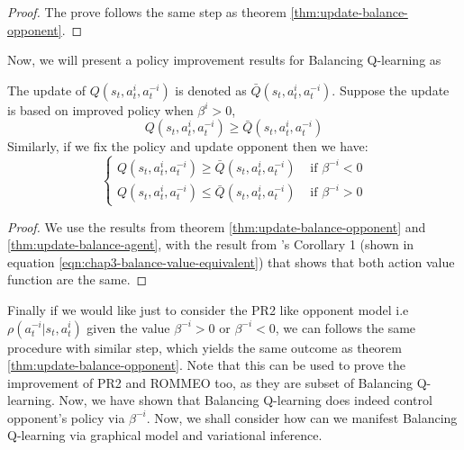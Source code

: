 \begin{proof}
The prove follows the same step as theorem \ref{thm:update-balance-opponent}.
\end{proof}
Now, we will present a policy improvement results for Balancing Q-learning as 
\begin{corollary}
    The update of $Q(s_t, a^i_t, a^{-i}_t)$ is denoted as $\bar{Q}(s_t, a^i_t, a^{-i}_t)$. Suppose the update is based on improved policy when $\beta^i > 0$, 
    \begin{equation}
        Q(s_t, a^i_t, a^{-i}_t) \ge \bar{Q}(s_t, a^i_t, a^{-i}_t)
    \end{equation}
    Similarly, if we fix the policy and update opponent then we have:
    \begin{equation}
    \begin{cases}
        Q(s_t, a^i_t, a^{-i}_t) \ge \bar{Q}(s_t, a^i_t, a^{-i}_t) &\text{ if } \beta^{-i} < 0 \\
        Q(s_t, a^i_t, a^{-i}_t) \le \bar{Q}(s_t, a^i_t, a^{-i}_t)&\text{ if } \beta^{-i} > 0
    \end{cases}
    \end{equation}
\end{corollary}
\begin{proof}
We use the results from theorem \ref{thm:update-balance-opponent} and \ref{thm:update-balance-agent}, with the result from \cite{grau2018balancing}'s Corollary 1 (shown in equation \ref{eqn:chap3-balance-value-equivalent}) that shows that both action value function are the same.
\end{proof}
Finally if we would like just to consider the PR2 like opponent model i.e $\rho(a^{-i}_t | s_t, a^i_t)$ given the value $\beta^{-i} > 0$ or $\beta^{-i} < 0$, we can follows the same procedure with similar step, which yields the same outcome as theorem \ref{thm:update-balance-opponent}. Note that this can be used to prove the improvement of PR2 and ROMMEO too, as they are subset of Balancing Q-learning. Now, we have shown that Balancing Q-learning does indeed control opponent's policy via $\beta^{-i}$. Now, we shall consider how can we manifest Balancing Q-learning via graphical model and variational inference.